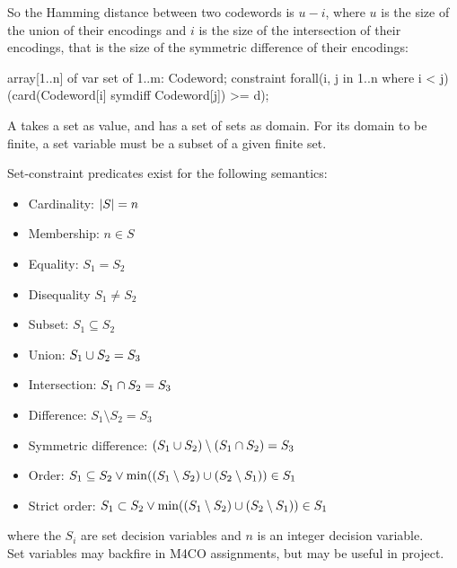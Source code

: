 \documentclass{cons-beamer}
\begin{document}
\begin{flashcardminizinc}
\begin{frame}[fragile]
\begin{example}
    So the Hamming distance between two codewords is  $u - i$,
    where $u$ is the size of the union of their encodings and $i$ is
    the size of the intersection of their encodings, that is the size
    of the symmetric difference of their encodings:

    \begin{mznno}
  array[1..n] of var set of 1..m: Codeword;
  constraint forall(i, j in 1..n where i < j)
    (card(Codeword[i] symdiff Codeword[j]) >= d);
    \end{mznno}
  \end{example}
  \begin{definition}
    A  takes a set as value, and has
    a set of sets as domain.  For its domain to be finite, a set
    variable must be a subset of a given finite set.
  \end{definition}
\end{frame}

\begin{frame}
  Set-constraint predicates exist for the following semantics: \vfill
  \begin{itemize}
  \item Cardinality: $\left\lvert S\right\rvert = n$ \vfill
  \item Membership: $n \in S$ \vfill
  \item Equality: $S_1 = S_2$ \vfill
  \item Disequality $S_1 \neq S_2$ \vfill
  \item Subset: $S_1 \subseteq S_2$ \vfill
  \item Union: $S_1 \cup S_2 = S_3$ \vfill
  \item Intersection: $S_1 \cap S_2 = S_3$ \vfill
  \item Difference: $S_1 \setminus S_2 = S_3$ \vfill
  \item Symmetric difference:
    $(S_1 \cup S_2) \setminus (S_1 \cap S_2) = S_3$ \vfill
  \item Order:
    $S_1 \subseteq S_2 \lor \min((S_1 \setminus S_2) \cup (S_2
    \setminus S_1)) \in S_1$ \vfill
  \item Strict order:
    $S_1 \subset S_2 \lor \min((S_1 \setminus S_2) \cup (S_2
    \setminus S_1)) \in S_1$
  \end{itemize}\vfill
  where the $S_i$ are set decision variables and $n$ is an integer
  decision variable. \\ \alert{Set variables may backfire in M4CO
    assignments, but may be useful in project.}
\end{frame}


\end{flashcardminizinc}
\end{document}
